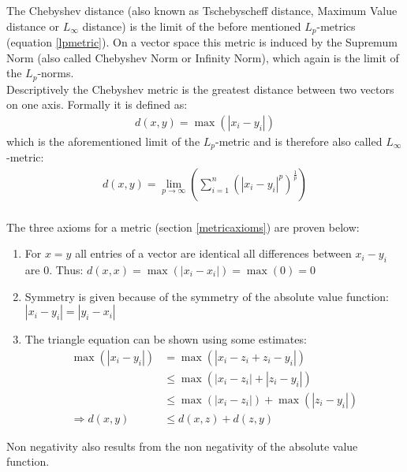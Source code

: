 The Chebyshev distance (also known as Tschebyscheff distance, Maximum Value distance or $L_\infty$ distance) is the limit of the before mentioned $L_p$-metrics (equation \ref{lpmetric}). On a vector space this metric is induced by the Supremum Norm (also called Chebyshev Norm or Infinity Norm), which again is the limit of the $L_p$-norms.\\
Descriptively the Chebyshev metric is the greatest distance between two vectors on one axis. Formally it is defined as:
%
\begin{align}
    d(x, y) = \max (| x_i - y_i |)
\end{align}
%
which is the aforementioned limit of the $L_p$-metric and is therefore also called $L_\infty$-metric:
\begin{align}
    d(x, y) = \lim \limits_{p \to \infty} \left( \sum_{i=1}^{n}(|x_i-y_i|^p)^\frac{1}{p} \right)
\end{align}
\ \\
The three axioms for a metric (section \ref{metricaxioms}) are proven below:
\begin{enumerate}
    \item For $x = y$ all entries of a vector are identical all differences between $x_i - y_i$ are $0$. Thus: $d(x,x) = \max (|x_i - x_i|) = \max (0) = 0$
    \item Symmetry is given because of the symmetry of the absolute value function: 
          $| x_i - y_i | = | y_i - x_i |$
    \item The triangle equation can be shown using some estimates:
    \begin{align*}
        \max(| x_i - y_i |) &= \max(|x_i - z_i + z_i - y_i|)\\
         &\leq \max(|x_i - z_i|+ |z_i - y_i|) \\
         &\leq \max(| x_i - z_i |) + \max(|z_i - y_i|)\\
        \Rightarrow d(x,y) &\leq d(x, z) + d(z, y)
    \end{align*}
\end{enumerate}
Non negativity also results from the non negativity of the absolute value function.
